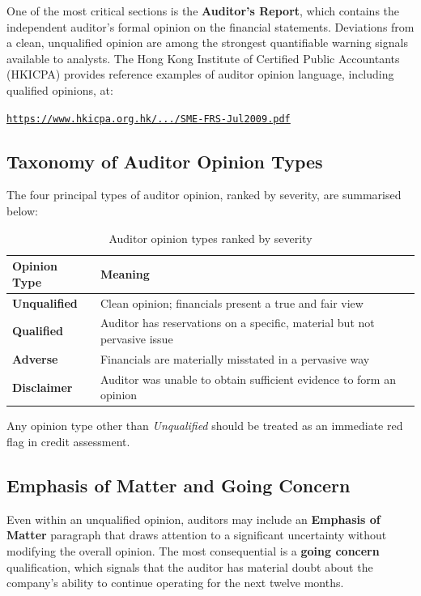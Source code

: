 \documentclass[12pt,a4paper]{article}
\begin{document}
One of the most critical sections is the \textbf{Auditor's Report}, which contains the
independent auditor's formal opinion on the financial statements. Deviations from a
clean, unqualified opinion are among the strongest quantifiable warning signals available
to analysts. The Hong Kong Institute of Certified Public Accountants (HKICPA) provides
reference examples of auditor opinion language, including qualified opinions, at:

\begin{center}
  \href{https://www.hkicpa.org.hk/professionaltechnical/assurance/example_auditors/SME-FRS-Jul2009.pdf}
  {\texttt{https://www.hkicpa.org.hk/.../SME-FRS-Jul2009.pdf}}
\end{center}

\subsection{Taxonomy of Auditor Opinion Types}

The four principal types of auditor opinion, ranked by severity, are summarised below:

\begin{table}[H]
\centering
\begin{tabular}{>{\bfseries}p{3.5cm} p{9cm}}
\toprule
Opinion Type & Meaning \\
\midrule
Unqualified & Clean opinion; financials present a true and fair view \\
\addlinespace
Qualified & Auditor has reservations on a specific, material but not pervasive issue \\
\addlinespace
Adverse & Financials are materially misstated in a pervasive way \\
\addlinespace
Disclaimer & Auditor was unable to obtain sufficient evidence to form an opinion \\
\bottomrule
\end{tabular}
\caption{Auditor opinion types ranked by severity}
\end{table}

Any opinion type other than \textit{Unqualified} should be treated as an immediate red flag
in credit assessment.

\subsection{Emphasis of Matter and Going Concern}

Even within an unqualified opinion, auditors may include an \textbf{Emphasis of Matter} paragraph
that draws attention to a significant uncertainty without modifying the overall opinion.
The most consequential is a \textbf{going concern} qualification, which signals that the
auditor has material doubt about the company's ability to continue operating for the next
twelve months.
\end{document}
